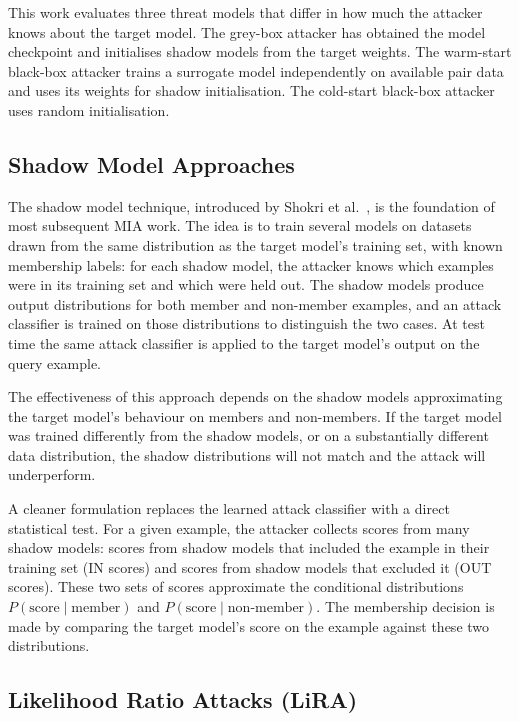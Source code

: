 This work evaluates three threat models that differ in how much the attacker knows about the target model. The grey-box attacker has obtained the model checkpoint and initialises shadow models from the target weights. The warm-start black-box attacker trains a surrogate model independently on available pair data and uses its weights for shadow initialisation. The cold-start black-box attacker uses random initialisation.

\subsection{Shadow Model Approaches}
\label{ssec:bg_shadow}

The shadow model technique, introduced by Shokri et al.~\cite{shokri2017membership}, is the foundation of most subsequent MIA work. The idea is to train several models on datasets drawn from the same distribution as the target model's training set, with known membership labels: for each shadow model, the attacker knows which examples were in its training set and which were held out. The shadow models produce output distributions for both member and non-member examples, and an attack classifier is trained on those distributions to distinguish the two cases. At test time the same attack classifier is applied to the target model's output on the query example.

The effectiveness of this approach depends on the shadow models approximating the target model's behaviour on members and non-members. If the target model was trained differently from the shadow models, or on a substantially different data distribution, the shadow distributions will not match and the attack will underperform.

A cleaner formulation replaces the learned attack classifier with a direct statistical test. For a given example, the attacker collects scores from many shadow models: scores from shadow models that included the example in their training set (IN scores) and scores from shadow models that excluded it (OUT scores). These two sets of scores approximate the conditional distributions $P(\text{score} \mid \text{member})$ and $P(\text{score} \mid
\text{non-member})$. The membership decision is made by comparing the target
model's score on the example against these two distributions.

\subsection{Likelihood Ratio Attacks (LiRA)}
\label{ssec:bg_lira}

